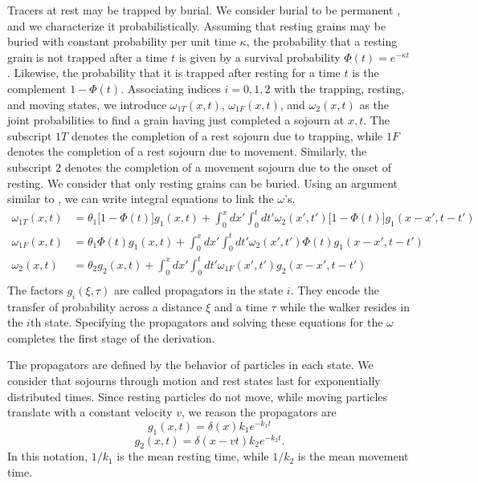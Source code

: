 \documentclass[]{agujournal2018}
\newcommand\be{\begin{equation}}
\newcommand\ee{\end{equation}}
\newcommand\om{\omega}
\begin{document}
Tracers at rest may be trapped by burial.
We consider burial to be permanent \citep[e.g.][]{Wu2019}, and we characterize it probabilistically.
Assuming that resting grains may be buried with constant probability per unit time $\kappa$, the probability that a resting grain is not trapped after a time $t$ is given by a survival probability $\Phi(t) = e^{-\kappa t}$. Likewise, the probability that it is trapped after resting for a time $t$ is the complement $1-\Phi(t)$.
Associating indices $i=0,1,2$ with the trapping, resting, and moving states, we introduce $\omega_{1T}(x,t)$, $\omega_{1F}(x,t)$, and $\omega_2(x,t)$ as the joint probabilities to find a grain having just completed a sojourn at $x,t$.
The subscript ${1T}$ denotes the completion of a rest sojourn due to trapping, while $1F$ denotes the completion of a rest sojourn due to movement.
Similarly, the subscript $2$ denotes the completion of a movement sojourn due to the onset of resting.
We consider that only resting grains can be buried.
Using an argument similar to \citet{Weiss1994}, we can write integral equations to link the $\omega$'s. 
\begin{align}
\om_{1T}(x,t) &= \theta_1\big[1-\Phi(t)\big]g_1(x,t) + \int_0^x dx' \int_0^t dt' \om_2(x',t')\big[1-\Phi(t)\big]g_1(x-x',t-t')\\
\om_{1F}(x,t) &= \theta_1\Phi(t)g_1(x,t) + \int_0^x dx' \int_0^t dt' \om_2(x',t') \Phi(t) g_1(x-x',t-t')\\
\om_2(x,t) &= \theta_2 g_2(x,t) + \int_0^x dx' \int_0^t dt' \om_{1F}(x',t')g_2(x-x',t-t')\\
\end{align}
The factors $g_i(\xi,\tau)$ are called propagators in the state $i$. They encode the transfer of probability across a distance $\xi$ and a time $\tau$ while the walker resides in the $i$th state.
Specifying the propagators and solving these equations for the $\omega$ completes the first stage of the derivation.

The propagators are defined by the behavior of particles in each state.
We consider that sojourns through motion and rest states last for exponentially distributed times.
Since resting particles do not move, while moving particles translate with a constant velocity $v$, we reason the propagators are 
\be g_1(x,t) = \delta(x) k_1e^{-k_1t}\ee
\be g_2(x,t) = \delta(x-vt)k_2e^{-k_2t}.\ee
In this notation, $1/k_1$ is the mean resting time, while $1/k_2$ is the mean movement time.
\end{document}
